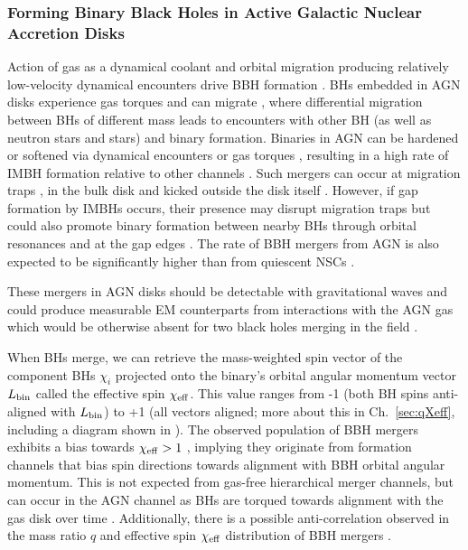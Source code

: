 \subsubsection{Forming Binary Black Holes in Active Galactic Nuclear Accretion Disks}
Action of gas as a dynamical coolant and orbital migration producing relatively low-velocity dynamical encounters drive BBH formation \citep[e.g.][]{Rowan+23,QianLiLai24,DodiciTremaine24}.
BHs embedded in AGN disks experience gas torques and can migrate \citep[e.g.][]{Syer+91,Levin07,McKernan+12}, where differential migration between BHs of different mass leads to encounters with other BH (as well as neutron stars and stars) and binary formation.
Binaries in AGN can be hardened or softened via dynamical encounters \citep[e.g.][]{Leigh+18,Samsing+20,Wang+21} or gas torques  \citep[e.g.][]{Tiede+20,Derdzinski+21,YapingLi+21}, resulting in a high rate of IMBH formation relative to other channels \citep{McKernan+12,Bellovary+16,Secunda+21,Yang+19,McKernan+20a,TagawaHaimanKocsis20,Vaccaro+24}.
Such mergers can occur at migration traps \citep[e.g.][]{Lyra+10,Sandor+11,Horn+12,Bellovary+16,Yang+19,Secunda+20}, in the bulk disk \citep[e.g.][]{Tagawa+20spin,McKernan+20a} and kicked outside the disk itself \citep{Tagawa+20b}.
However, if gap formation by IMBHs occurs, their presence may disrupt migration traps \citep{Gilbaum+25} but could also promote binary formation between nearby BHs through orbital resonances \citep{Horn+12} and at the gap edges \citep{KuchnerLecar02,Masset+06}.
The rate of BBH mergers from AGN is also expected to be significantly higher than from quiescent NSCs \citep{FordMcKernan22}.

These mergers in AGN disks should be detectable with gravitational waves \citep{McKernan+14,Bartos+17,Stone+17,Secunda+19} and could produce measurable EM counterparts from interactions with the AGN gas which would be otherwise absent for two black holes merging in the field \citep{McKernan+19,Perna+21}.

When BHs merge, we can retrieve the mass-weighted spin vector of the component BHs $\chi_i$ projected onto the binary's orbital angular momentum vector $L_{\rm bin}$ called the effective spin $\chi_{\rm eff}$.
This value ranges from -1 (both BH spins anti-aligned with $L_{\rm bin}$) to +1 (all vectors aligned; more about this in Ch.~\ref{sec:qXeff}, including a diagram shown in ).
The observed population of BBH mergers exhibits a bias towards $\chi_{\rm eff}>1$ \citep{Abbott+23-O3b}, implying they originate from formation channels that bias spin directions towards alignment with BBH orbital angular momentum.
This is not expected from gas-free hierarchical merger channels, but can occur in the AGN channel as BHs are torqued towards alignment with the gas disk over time \citep{Tagawa+20spin,Vajpeyi+22,McKernanFord24}.
Additionally, there is a possible anti-correlation observed in the mass ratio $q$ and effective spin $\chi_{\rm eff}$ distribution of BBH mergers \citep{Callister+21}.

